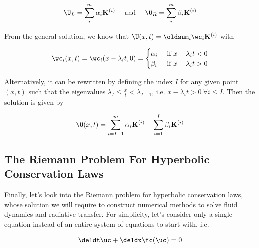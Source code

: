\begin{align}
  \U_L = \sum_i^m \alpha_i \mathbf{K}^{(i)} \quad \text{ and } \quad
  \U_R = \sum_i^m \beta_i \mathbf{K}^{(i)}
\end{align}

From the general solution, we know that $\U(x, t) = \oldsum_i \wc_i \mathbf{K}^{(i)}$ with

\begin{align}
    \wc_i(x, t) = \wc_i(x - \lambda_i t, 0) = \begin{cases}
                                               \alpha_i & \text{ if } x - \lambda_i t < 0 \\
                                               \beta_i & \text{ if } x - \lambda_i t > 0 \\
                                              \end{cases}
\end{align}

Alternatively, it can be rewritten by defining the index $I$ for any given point $(x, t)$ such that
the eigenvalues $\lambda_I \leq \frac{x}{t} < \lambda_{I+1}$, i.e. $x - \lambda_i t > 0\ \forall i
\leq I$. Then the solution is given by

\begin{align}
    \U(x, t) = \sum_{i = I+1}^m \alpha_i \mathbf{K}^{(i)} + \sum_{i=1}^I \beta_i \mathbf{K}^{(i)}
\end{align}
















\subsection{The Riemann Problem For Hyperbolic Conservation Laws}

Finally, let's look into the Riemann problem for hyperbolic conservation laws, whose solution we
will require to construct numerical methods to solve fluid dynamics and radiative transfer. For
simplicity, let's consider only a single equation instead of an entire system of equations to start
with, i.e.

\begin{align}
    \deldt \uc + \deldx \fc(\uc) = 0
\end{align}

